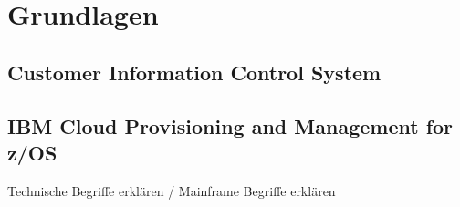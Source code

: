 \chapter{Grundlagen}\label{ch:grundlagen}

\section{Customer Information Control System}\label{cics}

\section{IBM Cloud Provisioning and Management for z/OS}\label{sec:zosmf}

Technische Begriffe erklären / Mainframe Begriffe erklären

